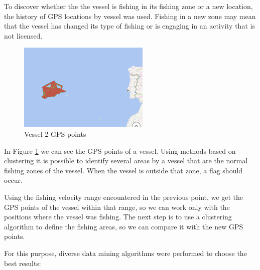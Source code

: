 To discover whether the
the vessel is fishing in its fishing zone or a new location, the history of GPS locations by vessel was used.
Fishing in a new zone may mean that the vessel has changed its type of fishing or is engaging in an activity that is not licensed.


\begin{figure}[H]
    \centering
    \includegraphics[width=0.8\linewidth]{Chapters/img/gps_vessel2.png}
    \caption{Vessel 2 GPS points}
    \label{fig:gps_vessel2}
\end{figure}

In Figure \ref{fig:gps_vessel2} we can see the GPS points of a vessel. Using methods based on clustering it is possible to identify several areas by a vessel that are the normal fishing zones of the vessel. When the vessel is outside that zone, a flag should occur.

Using the fishing velocity range encountered in the previous point, we get the GPS points of the vessel within that range, so we can work only with the positions where the vessel was fishing. The next step is to use a clustering algorithm to define the fishing areas, so we can compare it with the new GPS points. 

For this purpose, diverse data mining algorithms were performed to choose the best results:

